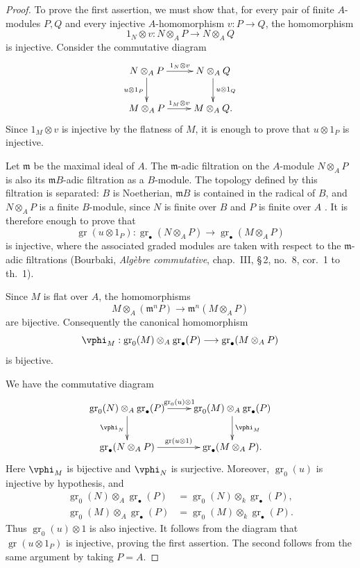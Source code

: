 \begin{proof}
To prove the first assertion, we must show that, for every pair of
finite $A$-modules $P,Q$ and every injective $A$-homomorphism
$v:P\to Q$, the homomorphism
\[
  1_N\otimes v:N\otimes_A P\longrightarrow N\otimes_A Q
\]
is injective.  Consider the commutative diagram
\[
  \xymatrix{
    N\otimes_A P
      \ar[r]^-{1_N\otimes v}
      \ar[d]_{u\otimes1_P}
      &
    N\otimes_A Q
      \ar[d]^{u\otimes1_Q}
    \\
    M\otimes_A P
      \ar[r]^-{1_M\otimes v}
      &
    M\otimes_A Q .
  }
\]
Since $1_M\otimes v$ is injective by the flatness of $M$, it is
enough to prove that $u\otimes1_P$ is injective.

Let $\mathfrak m$ be the maximal ideal of $A$.  The
$\mathfrak m$-adic filtration on the $A$-module $N\otimes_A P$ is
also its $\mathfrak mB$-adic filtration as a $B$-module.  The
topology defined by this filtration is separated: $B$ is
Noetherian, $\mathfrak mB$ is contained in the radical of $B$, and
$N\otimes_A P$ is a finite $B$-module, since $N$ is finite over $B$
and $P$ is finite over $A$ .  It is therefore
enough to prove that
\[
  \operatorname{gr}(u\otimes1_P):
  \operatorname{gr}_\bullet(N\otimes_A P)
  \longrightarrow
  \operatorname{gr}_\bullet(M\otimes_A P)
\]
is injective, where the associated graded modules are taken with
respect to the $\mathfrak m$-adic filtrations (Bourbaki,
\emph{Alg\`ebre commutative}, chap.~III, \S\,2, no.~8, cor.~1 to
th.~1).

Since $M$ is flat over $A$, the homomorphisms
\[
  M\otimes_A(\mathfrak m^nP)
  \longrightarrow
  \mathfrak m^n(M\otimes_A P)
\]
are bijective.  Consequently the canonical homomorphism
\[
  \vphi_M:
  \operatorname{gr}_0(M)\otimes_A\operatorname{gr}_\bullet(P)
  \longrightarrow
  \operatorname{gr}_\bullet(M\otimes_A P)
\]
is bijective.


We have the commutative diagram
\[
  \xymatrix{
    \operatorname{gr}_0(N)\otimes_A\operatorname{gr}_\bullet(P)
      \ar[r]^-{\operatorname{gr}_0(u)\otimes1}
      \ar[d]_{\vphi_N}
      &
    \operatorname{gr}_0(M)\otimes_A\operatorname{gr}_\bullet(P)
      \ar[d]^{\vphi_M}
    \\
    \operatorname{gr}_\bullet(N\otimes_A P)
      \ar[r]^-{\operatorname{gr}(u\otimes1)}
      &
    \operatorname{gr}_\bullet(M\otimes_A P).
  }
\]
Here $\vphi_M$ is bijective and $\vphi_N$ is surjective.
Moreover, $\operatorname{gr}_0(u)$ is injective by hypothesis, and
\[
\begin{split}
  \operatorname{gr}_0(N)\otimes_A\operatorname{gr}_\bullet(P)
    &=
  \operatorname{gr}_0(N)\otimes_k\operatorname{gr}_\bullet(P),\\
  \operatorname{gr}_0(M)\otimes_A\operatorname{gr}_\bullet(P)
    &=
  \operatorname{gr}_0(M)\otimes_k\operatorname{gr}_\bullet(P).
\end{split}
\]
Thus $\operatorname{gr}_0(u)\otimes1$ is also injective.  It
follows from the diagram that $\operatorname{gr}(u\otimes1_P)$ is
injective, proving the first assertion.  The second follows from
the same argument by taking $P=A$.
\end{proof}

